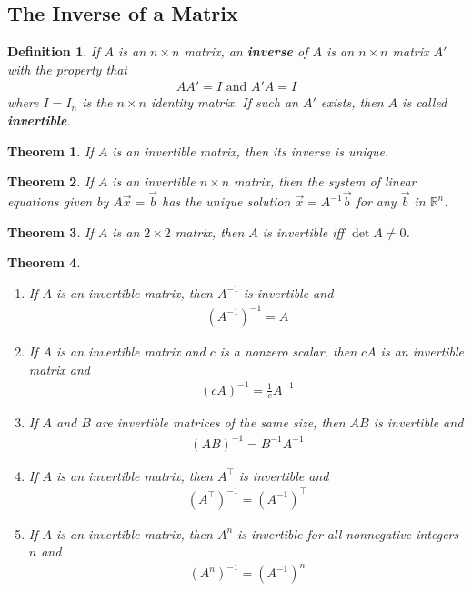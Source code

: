 \documentclass{article}
\theoremstyle{sltheorem}
\newtheorem{definition}{Definition}[section]
\newtheorem{theorem}{Theorem}[section]
\begin{document}
\subsection{The Inverse of a Matrix}
\begin{definition}
    If $A$ is an $n\times n$ matrix, an \textbf{inverse} of $A$ is an $n\times n$ matrix $A'$ with the property that
    \begin{gather*}
        AA'=I\text{  and  } A'A = I 
    \end{gather*}
    where $I = I_n$ is the $n\times n$ identity matrix. If such an $A'$ exists, then $A$ is called \textbf{invertible}.
\end{definition}
\begin{theorem}
    If $A$ is an invertible matrix, then its inverse is unique.
\end{theorem}
\begin{theorem}
    If $A$ is an invertible $n\times n$ matrix, then the system of linear equations given by $A\vec x = \vec b$ has the unique solution $\vec x = A^{-1}\vec b$ for any $\vec b$ in $\mathbb{R}^n$.
\end{theorem}
\begin{theorem}
    If $A$ is an $2\times 2$ matrix, then $A$ is invertible iff $\det A \not= 0$.
\end{theorem}
\begin{theorem}
    \begin{enumerate}
        \item If $A$ is an invertible matrix, then $A^{-1}$ is invertible and
        \begin{gather*}
            (A^{-1})^{-1} = A
        \end{gather*}
        \item If $A$ is an invertible matrix and $c$ is a nonzero scalar, then $cA$ is an invertible matrix and \begin{gather*}
            (cA)^{-1} = \frac{1}{c}A^{-1}
        \end{gather*}
        \item If $A$ and $B$ are invertible matrices of the same size, then $AB$ is invertible and \begin{gather*}
            (AB)^{-1} = B^{-1} A^{-1}
        \end{gather*}
        \item If $A$ is an invertible matrix, then $A^\intercal$ is invertible and \begin{gather*}
            (A^\intercal)^{-1}=(A^{-1})^\intercal
        \end{gather*}
        \item If $A$ is an invertible matrix, then $A^n$ is invertible for all nonnegative integers $n$ and \begin{gather*}
            (A^n)^{-1} = (A^{-1})^n
        \end{gather*}
    \end{enumerate}
\end{theorem}
\end{document}
